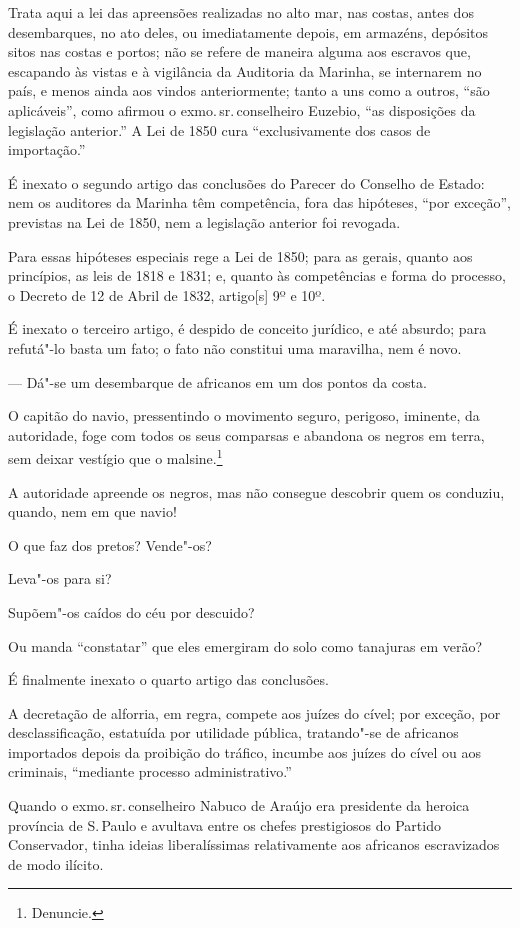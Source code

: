 Trata aqui a lei das apreensões realizadas no alto mar, nas costas,
antes dos desembarques, no ato deles, ou imediatamente depois, em
armazéns, depósitos sitos nas costas e portos; não se refere de maneira
alguma aos escravos que, escapando às vistas e à vigilância da Auditoria
da Marinha, se internarem no país, e menos ainda aos vindos
anteriormente; tanto a uns como a outros, ``são aplicáveis'', como afirmou
o exmo.\,sr.\,conselheiro Euzebio, ``as disposições da legislação
anterior.'' A Lei de 1850 cura ``exclusivamente dos casos de importação.''

É inexato o segundo artigo das conclusões do Parecer do Conselho de
Estado: nem os auditores da Marinha têm competência, fora das hipóteses,
``por exceção'', previstas na Lei de 1850, nem a legislação anterior foi
revogada.

Para essas hipóteses especiais rege a Lei de 1850; para as gerais,
quanto aos princípios, as leis de 1818 e 1831; e, quanto às competências
e forma do processo, o Decreto de 12 de Abril de 1832, artigo{[}s{]} 9º
e 10º.

É inexato o terceiro artigo, é despido de conceito jurídico, e até
absurdo; para refutá"-lo basta um fato; o fato não constitui uma
maravilha, nem é novo.

--- Dá"-se um desembarque de africanos em um dos pontos da costa.

O capitão do navio, pressentindo o movimento seguro, perigoso, iminente,
da autoridade, foge com todos os seus comparsas e abandona os negros em
terra, sem deixar vestígio que o malsine.\footnote{Denuncie.}

A autoridade apreende os negros, mas não consegue descobrir quem os
conduziu, quando, nem em que navio!

O que faz dos pretos? Vende"-os?

Leva"-os para si?

Supõem"-os caídos do céu por descuido?

Ou manda ``constatar'' que eles emergiram do solo como tanajuras em verão?

É finalmente inexato o quarto artigo das conclusões.

A decretação de alforria, em regra, compete aos juízes do cível; por
exceção, por desclassificação, estatuída por utilidade pública,
tratando"-se de africanos importados depois da proibição do tráfico,
incumbe aos juízes do cível ou aos criminais, ``mediante processo
administrativo.''

Quando o exmo.\,sr.\,conselheiro Nabuco de Araújo era presidente da
heroica província de S.\,Paulo e avultava entre os chefes prestigiosos do
Partido Conservador, tinha ideias liberalíssimas relativamente aos
africanos escravizados de modo ilícito.

